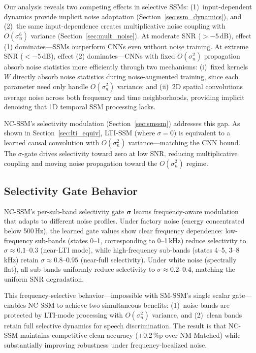 \documentclass[journal]{IEEEtran}
\begin{document}
Our analysis reveals two competing effects in selective SSMs:
(1)~input-dependent dynamics provide implicit noise adaptation (Section~\ref{sec:ssm_dynamics}), and
(2)~the same input-dependence creates multiplicative noise coupling with $O(\sigma_n^6)$ variance (Section~\ref{sec:mult_noise}).
At moderate SNR ($> -5$\,dB), effect (1) dominates---SSMs outperform CNNs even without noise training.
At extreme SNR ($< -5$\,dB), effect (2) dominates---CNNs with fixed $O(\sigma_n^2)$ propagation absorb noise statistics more efficiently through two mechanisms: (i)~fixed kernels $W$ directly absorb noise statistics during noise-augmented training, since each parameter need only handle $O(\sigma_n^2)$ variance; and (ii)~2D spatial convolutions average noise across both frequency and time neighborhoods, providing implicit denoising that 1D temporal SSM processing lacks.

NC-SSM's selectivity modulation (Section~\ref{sec:smssm}) addresses this gap.
As shown in Section~\ref{sec:lti_equiv}, LTI-SSM (where $\sigma = 0$) is equivalent to a learned causal convolution with $O(\sigma_n^2)$ variance---matching the CNN bound.
The $\sigma$-gate drives selectivity toward zero at low SNR, reducing multiplicative coupling and moving noise propagation toward the $O(\sigma_n^2)$ regime.

\subsection{Selectivity Gate Behavior}

NC-SSM's per-sub-band selectivity gate $\bm{\sigma}$ learns frequency-aware modulation that adapts to different noise profiles.
Under factory noise (energy concentrated below 500\,Hz), the learned gate values show clear frequency dependence: low-frequency sub-bands (states 0--1, corresponding to 0--1\,kHz) reduce selectivity to $\sigma \approx 0.1$--$0.3$ (near-LTI mode), while high-frequency sub-bands (states 4--5, 3--8\,kHz) retain $\sigma \approx 0.8$--$0.95$ (near-full selectivity).
Under white noise (spectrally flat), all sub-bands uniformly reduce selectivity to $\sigma \approx 0.2$--$0.4$, matching the uniform SNR degradation.

This frequency-selective behavior---impossible with SM-SSM's single scalar gate---enables NC-SSM to achieve two simultaneous benefits:
(1)~noise bands are protected by LTI-mode processing with $O(\sigma_n^2)$ variance, and
(2)~clean bands retain full selective dynamics for speech discrimination.
The result is that NC-SSM maintains competitive clean accuracy (+0.2\,\%p over NM-Matched) while substantially improving robustness under frequency-localized noise.
\end{document}
